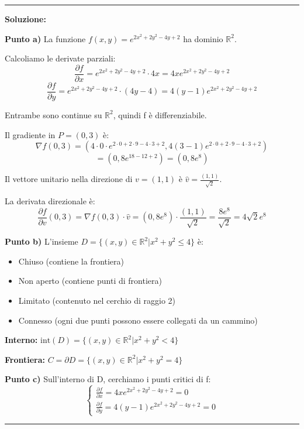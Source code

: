 \documentclass[12pt, a4paper]{article}
\newenvironment{solution}
{\par\noindent\rule{\textwidth}{0.4pt}\par\textbf{Soluzione:}\medskip\par}
{\par\rule{\textwidth}{0.4pt}\par\bigskip}
\begin{document}
\begin{solution}
\textbf{Punto a)} La funzione $f(x,y) = e^{2x^{2}+2y^{2}-4y+2}$ ha dominio $\mathbb{R}^2$.

Calcoliamo le derivate parziali:
\[
\frac{\partial f}{\partial x} = e^{2x^{2}+2y^{2}-4y+2} \cdot 4x = 4xe^{2x^{2}+2y^{2}-4y+2}
\]
\[
\frac{\partial f}{\partial y} = e^{2x^{2}+2y^{2}-4y+2} \cdot (4y - 4) = 4(y-1)e^{2x^{2}+2y^{2}-4y+2}
\]

Entrambe sono continue su $\mathbb{R}^2$, quindi f è differenziabile.

Il gradiente in $P = (0,3)$ è:
\[
\nabla f(0,3) = (4 \cdot 0 \cdot e^{2 \cdot 0 + 2 \cdot 9 - 4 \cdot 3 + 2}, 4(3-1)e^{2 \cdot 0 + 2 \cdot 9 - 4 \cdot 3 + 2})
\]
\[
= (0, 8e^{18 - 12 + 2}) = (0, 8e^8)
\]

Il vettore unitario nella direzione di $v = (1,1)$ è $\hat{v} = \frac{(1,1)}{\sqrt{2}}$.

La derivata direzionale è:
\[
\frac{\partial f}{\partial v}(0,3) = \nabla f(0,3) \cdot \hat{v} = (0, 8e^8) \cdot \frac{(1,1)}{\sqrt{2}} = \frac{8e^8}{\sqrt{2}} = 4\sqrt{2}e^8
\]

\vspace{0.5cm}

\textbf{Punto b)} L'insieme $D = \{(x,y) \in \mathbb{R}^{2} | x^{2}+y^{2} \le 4\}$ è:
\begin{itemize}
    \item Chiuso (contiene la frontiera)
    \item Non aperto (contiene punti di frontiera)
    \item Limitato (contenuto nel cerchio di raggio 2)
    \item Connesso (ogni due punti possono essere collegati da un cammino)
\end{itemize}

\textbf{Interno:} $\text{int}(D) = \{(x,y) \in \mathbb{R}^{2} | x^{2}+y^{2} < 4\}$

\textbf{Frontiera:} $C = \partial D = \{(x,y) \in \mathbb{R}^{2} | x^{2}+y^{2} = 4\}$

\vspace{0.5cm}

\textbf{Punto c)} Sull'interno di D, cerchiamo i punti critici di f:
\[
\begin{cases}
\frac{\partial f}{\partial x} = 4xe^{2x^{2}+2y^{2}-4y+2} = 0 \\
\frac{\partial f}{\partial y} = 4(y-1)e^{2x^{2}+2y^{2}-4y+2} = 0
\end{cases}
\]


\end{solution}
\end{document}
